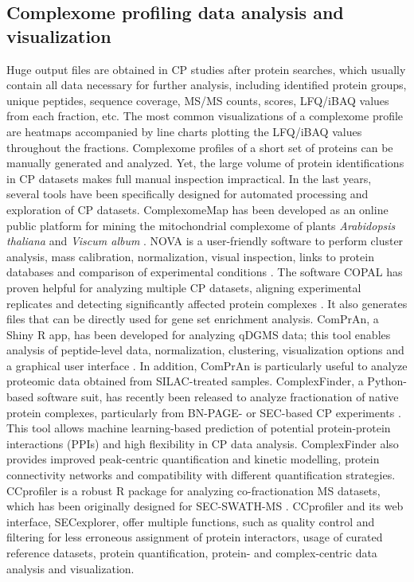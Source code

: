 \subsection*{Complexome profiling data analysis and visualization} \label{ssec:CP_MS_ssec2}
Huge output files are obtained in CP studies after protein searches, which usually contain all data necessary for further analysis, including identified protein groups, unique peptides, sequence coverage, MS/MS counts, scores, LFQ/iBAQ values from each fraction, etc. The most common visualizations of a complexome profile are heatmaps accompanied by line charts plotting the LFQ/iBAQ values throughout the fractions. Complexome profiles of a short set of proteins can be manually generated and analyzed. Yet, the large volume of protein identifications in CP datasets makes full manual inspection impractical. In the last years, several tools have been specifically designed for automated processing and exploration of CP datasets. 
ComplexomeMap has been developed as an online public platform for mining the mitochondrial complexome of plants \emph{Arabidopsis thaliana} and \emph{Viscum album} \cite{Senkler_2017}. NOVA is a user-friendly software to perform cluster analysis, mass calibration, normalization, visual inspection, links to protein databases and comparison of experimental conditions \cite{Giese_2015}. The software COPAL has proven helpful for analyzing multiple CP datasets, aligning experimental replicates and detecting significantly affected protein complexes \cite{Van_Strien_2019}. It also generates files that can be directly used for gene set enrichment analysis. ComPrAn, a Shiny R app, has been developed for analyzing qDGMS data; this tool enables analysis of peptide-level data, normalization, clustering, visualization options and a graphical user interface \cite{Palenikova_2021a}. In addition, ComPrAn is particularly useful to analyze proteomic data obtained from SILAC-treated samples. ComplexFinder, a Python-based software suit, has recently been released to analyze fractionation of native protein complexes, particularly from BN-PAGE- or SEC-based CP experiments \cite{Nolte_2021}. This tool allows machine learning-based prediction of potential protein-protein interactions (PPIs) and high flexibility in CP data analysis. ComplexFinder also provides improved peak-centric quantification and kinetic modelling, protein connectivity networks and compatibility with different quantification strategies. CCprofiler is a robust R package for analyzing co-fractionation MS datasets, which has been originally designed for SEC-SWATH-MS \cite{Heusel_2019}. CCprofiler and its web interface, SECexplorer, offer multiple functions, such as quality control and filtering for less erroneous assignment of protein interactors, usage of curated reference datasets, protein quantification, protein- and complex-centric data analysis and visualization. 
